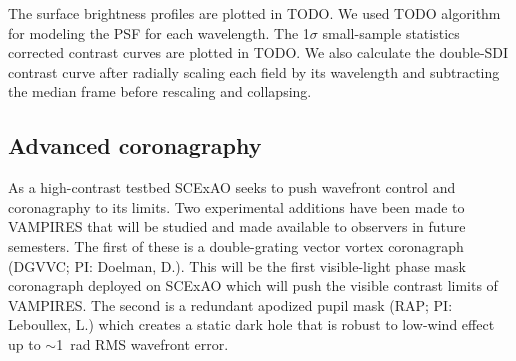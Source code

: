 The surface brightness profiles are plotted in TODO. We used TODO algorithm for modeling the PSF for each wavelength. The 1$\sigma$ small-sample statistics corrected contrast curves \citep{mawet_fundamental_2014} are plotted in TODO. We also calculate the double-SDI contrast curve after radially scaling each field by its wavelength and subtracting the median frame before rescaling and collapsing.

\subsection{Advanced coronagraphy}

As a high-contrast testbed SCExAO seeks to push wavefront control and coronagraphy to its limits. Two experimental additions have been made to VAMPIRES that will be studied and made available to observers in future semesters. The first of these is a double-grating vector vortex coronagraph (DGVVC; PI: Doelman, D.). This will be the first visible-light phase mask coronagraph deployed on SCExAO which will push the visible contrast limits of VAMPIRES. The second is a redundant apodized pupil mask (RAP; PI: Leboullex, L.) which creates a static dark hole that is robust to low-wind effect up to $\sim$\SI{1}{rad} RMS wavefront error.